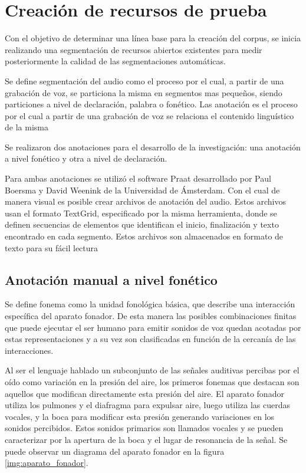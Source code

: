 \chapter{Creación de recursos de prueba}

Con el objetivo de determinar una línea base para la creación del corpus, se inicia realizando una segmentación de recursos abiertos existentes para medir posteriormente la calidad de las segmentaciones automáticas.

Se define segmentación del audio como el proceso por el cual, a partir de una grabación de voz, se particiona la misma en segmentos mas pequeños, siendo particiones a nivel de declaración, palabra o fonético. Las anotación es el proceso por el cual a partir de una grabación de voz se relaciona el contenido linguístico de la misma

Se realizaron dos anotaciones para el desarrollo de la investigación: una anotación a nivel fonético y otra a nivel de declaración.

Para ambas anotaciones se utilizó el software Praat \cite{Praat} desarrollado por Paul Boersma y David Weenink de la Universidad de Ámsterdam. Con el cual de manera visual es posible crear archivos de anotación del audio. Estos archivos usan el formato TextGrid, especificado por la misma herramienta, donde se definen secuencias de elementos que identifican el inicio, finalización y texto encontrado en cada segmento. Estos archivos son almacenados en formato de texto para su fácil lectura \cite{TextGrids}

\section{Anotación manual a nivel fonético}

Se define fonema como la unidad fonológica básica, que describe una interacción específica del aparato fonador. De esta manera las posibles combinaciones finitas que puede ejecutar el ser humano para emitir sonidos de voz quedan acotadas por estas representaciones\macb{,} y a su vez son clasificadas en función de la cercanía de las interacciones.

Al ser el lenguaje hablado un subconjunto de las señales auditivas percibas por el oído como variación en la presión del aire, los primeros fonemas que destacan son aquellos que modifican directamente esta presión del aire. El aparato fonador utiliza los pulmones y el diafragma para expulsar aire, luego utiliza las cuerdas vocales, y la boca para modificar esta presión generando variaciones en los sonidos percibidos. Estos sonidos primarios son llamados vocales y se pueden caracterizar por la apertura de la boca y el lugar de resonancia de la señal. Se puede observar un diagrama del aparato fonador en la figura \ref{img:aparato_fonador}.

